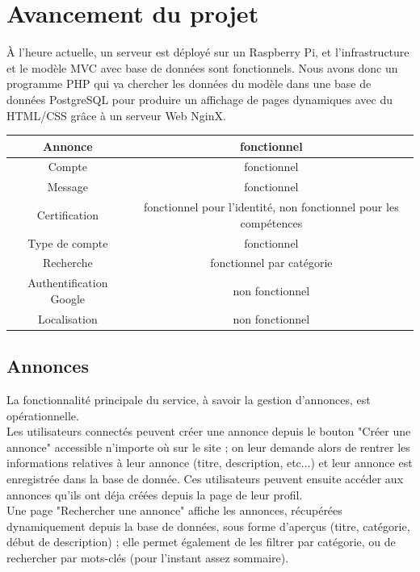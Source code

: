 \documentclass[a4paper,11pt]{article}
\begin{document}
\section{Avancement du projet}

À l'heure actuelle, un serveur est déployé sur un Raspberry Pi, et l'infrastructure et le modèle MVC
avec base de données sont fonctionnels. Nous avons donc un programme PHP qui va chercher les
données du modèle dans une base de données PostgreSQL pour produire un affichage de pages
dynamiques avec du HTML/CSS grâce à un serveur Web NginX.\\

\begin{tabular}{|c|c|}
  \hline Annonce & fonctionnel \\
  \hline Compte & fonctionnel\\
  \hline Message & fonctionnel\\
  \hline Certification & fonctionnel pour l'identité, non fonctionnel pour les compétences\\
  \hline Type de compte & fonctionnel\\
  \hline Recherche & fonctionnel par catégorie\\
  \hline Authentification Google & non fonctionnel\\
  \hline Localisation & non fonctionnel\\
  \hline
\end{tabular}

\subsection{Annonces}

La fonctionnalité principale du service, à savoir la gestion d'annonces, est opérationnelle.\\

Les utilisateurs connectés peuvent créer une annonce depuis le bouton "Créer une annonce" accessible n'importe où sur le site ; on leur demande alors de rentrer les informations relatives à leur annonce (titre, description, etc...) et leur annonce est enregistrée dans la base de donnée. Ces utilisateurs peuvent ensuite accéder aux annonces qu'ils ont déja créées depuis la page de leur profil.\\

Une page "Rechercher une annonce" affiche les annonces, récupérées dynamiquement depuis la base de données, sous forme d'aperçus (titre, catégorie, début de description) ; elle permet également de les filtrer par catégorie, ou de rechercher par mots-clés (pour l'instant assez sommaire).\\
\end{document}
